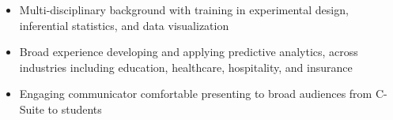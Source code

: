 \begin {cvparagraph}
\begin {itemize}
\vspace {2.0mm}
\item {Multi-disciplinary background with training in experimental design, inferential statistics, and data visualization}
\item {Broad experience developing and applying predictive analytics, across industries including education, healthcare, hospitality, and insurance}
\item {Engaging communicator comfortable presenting to broad audiences from C-Suite to students}
\end {itemize}
\end {cvparagraph}

